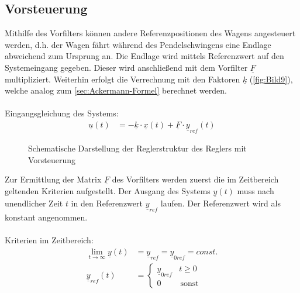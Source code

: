 \documentclass[
	pagesize,
	fontsize=12pt,
	paper=a4,
	oneside,
   reqno
]{scrartcl}
\begin{document}
\subsection{Vorsteuerung}
Mithilfe des Vorfilters können andere Referenzpositionen des Wagens angesteuert werden, d.h. der Wagen fährt während des Pendelschwingens eine Endlage abweichend zum Ursprung an. Die Endlage wird mittels Referenzwert auf den Systemeingang gegeben. Dieser wird anschließend mit dem Vorfilter $\underline{F}$ multipliziert. Weiterhin erfolgt die Verrechnung mit den Faktoren $\underline{k}$ (\autoref{fig:Bild9}), welche analog zum \autoref{sec:Ackermann-Formel} berechnet werden.\\\\
Eingangsgleichung des Systems:
\begin{align}\label{eq:Gleichung42}
    \underline{u}(t) &= -\underline{k}\cdot\underline{x}(t)+\underline{F}\cdot\underline{y}_{ref}(t)
\end{align}
\begin{figure}[H]
    \centering
    \caption[Reglerstruktur Vorsteuerung]{Schematische Darstellung der Reglerstruktur des Reglers mit Vorsteuerung}
    \label{fig:Bild9}
\end{figure}
Zur Ermittlung der Matrix $\underline{F}$ des Vorfilters werden zuerst die im Zeitbereich geltenden Kriterien aufgestellt. Der Ausgang des Systems $\underline{y}(t)$ muss nach unendlicher Zeit $t$ in den Referenzwert $\underline{y}_{ref}$ laufen. Der Referenzwert wird als konstant angenommen.\\\\
Kriterien im Zeitbereich:
\begin{align}
    \lim_{t \to \infty} \underline{y}(t) &= \underline{y}_{ref} = \underline{y}_{0ref} = const. \label{eq:Gleichung43}\\
    \underline{y}_{ref}(t) &=
    \begin{cases}
        \underline{y}_{0ref} & t \geq 0 \\
        0 & \, \text{sonst}
    \end{cases} \label{eq:Gleichung44}
\end{align}\\
\end{document}
